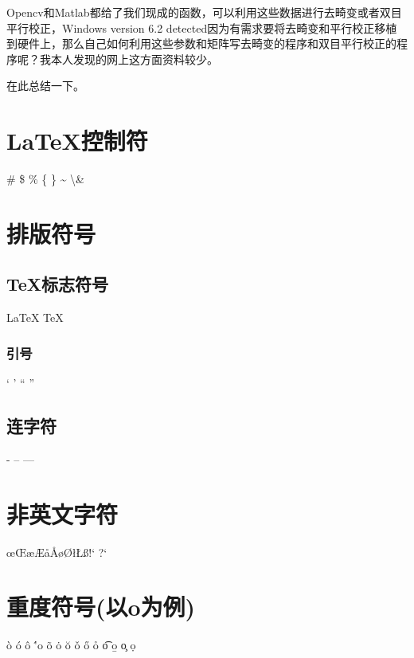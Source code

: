 \documentclass[10pt]{ctexart}%
\begin{document}
	\par Opencv和Matlab都给了我们现成的函数，\quad 可以利用这些数据进行去畸变或者双目平行校正，\qquad Windows version 6.2 detected因为有需求要将去畸变和平行校正移植到硬件上，那么自己如何利用这些参数和矩阵写去畸变的程序和双目平行校正的程序呢？我本人发现的网上这方面资料较少。\par 在此总结一下。
	\section{\LaTeX 控制符}
	\# \$ \% \{ \} \~{} \textbackslash \&
	
	\section{排版符号}
	
	\subsection{\TeX 标志符号}
	\LaTeX{} \TeX{}  \LaTeXe{}
	\XeLaTeX
	\subsubsection{引号}
	` ' `` ''
	\subsection{连字符}
	- -- ---
	\section{非英文字符}
	\oe \OE \ae \AE \aa \AA \o \O  \l \L \ss \SS !` ?`
	\section{重度符号(以o为例)}
	\`o \'o \^o \''o \~o \.o \u{o} \v{o} \H{o} 
	\r{o} \t{o} \b{o} \c{o} \d{o}
	

	
	
\end{document}
